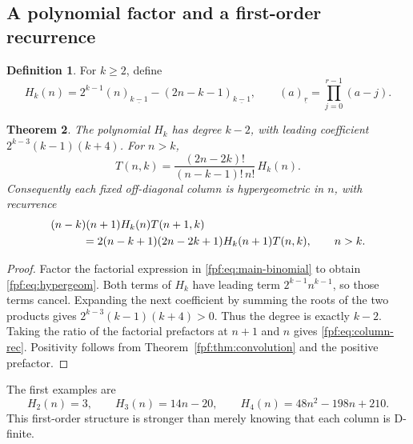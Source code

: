 \documentclass[11pt]{article}
\numberwithin{equation}{section}
\newtheorem{theorem}{Theorem}[section]
\theoremstyle{definition}
\newtheorem{definition}[theorem]{Definition}
\newcommand{\fall}[2]{(#1)_{\underline{#2}}}
\begin{document}
\subsection{A polynomial factor and a first-order recurrence}
\begin{definition}
For $k\ge2$, define
\begin{equation}\label{fpf:eq:H}
 H_k(n)=2^{k-1}\fall{n}{k-1}-\fall{2n-k-1}{k-1},
 \qquad \fall{a}{r}=\prod_{j=0}^{r-1}(a-j).
\end{equation}
\end{definition}
\begin{theorem}\label{fpf:thm:hypergeom}
The polynomial $H_k$ has degree $k-2$, with leading coefficient
$2^{k-3}(k-1)(k+4)$. For $n>k$,
\begin{equation}\label{fpf:eq:hypergeom}
 T(n,k)=\frac{(2n-2k)!}{(n-k-1)!\,n!}\,H_k(n).
\end{equation}
Consequently each fixed off-diagonal column is hypergeometric in $n$,
with recurrence
\begin{align}\label{fpf:eq:column-rec}
 &(n-k)(n+1)H_k(n)T(n+1,k)\notag\\
 &\hspace{1cm}=2(n-k+1)(2n-2k+1)H_k(n+1)T(n,k),\qquad n>k.
\end{align}
\end{theorem}
\begin{proof}
Factor the factorial expression in \eqref{fpf:eq:main-binomial} to obtain
\eqref{fpf:eq:hypergeom}. Both terms of $H_k$ have leading term
$2^{k-1}n^{k-1}$, so those terms cancel. Expanding the next coefficient by
summing the roots of the two products gives
$2^{k-3}(k-1)(k+4)>0$. Thus the degree is exactly $k-2$.
Taking the ratio of the factorial prefactors at $n+1$ and $n$ gives
\eqref{fpf:eq:column-rec}. Positivity follows from
Theorem~\ref{fpf:thm:convolution} and the positive prefactor.
\end{proof}
The first examples are
\begin{equation}\label{fpf:eq:H-examples}
 H_2(n)=3,\qquad H_3(n)=14n-20,\qquad
 H_4(n)=48n^2-198n+210.
\end{equation}
This first-order structure is stronger than merely knowing that each
column is D-finite.
\end{document}
